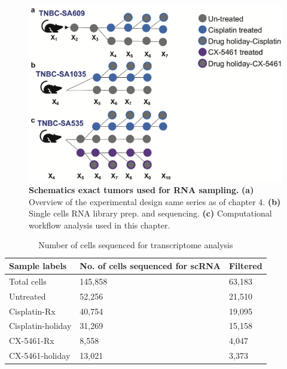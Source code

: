 \begin{figure}
\centering
\includegraphics[width=\textwidth]{Figures/chap5/SchematicsforRNAsampling.png}
	
\caption[SchematicsforRNAsampling]
	{\small
	\textbf{Schematics exact tumors used for RNA sampling.}
	   \textbf{(a)} Overview of the experimental design same series as of chapter 4.
	    \textbf{(b)} Single cells RNA library prep. and sequencing.
	    \textbf{(c)} Computational workflow analysis used in this chapter.
	}
	\label{fig:RNAsampletree}
\end{figure}


\begin{table}[htbp]
 \centering
  \caption{Number of cells sequenced for transcriptome analysis}
{
\begin{tabular}{|l|l|l|}
\hline
Sample labels     & No. of cells sequenced for scRNA & Filtered \\
\hline
Total cells          & 145,858                          & 63,183\\
Untreated         & 52,256                           & 21,510    \\
Cisplatin-Rx      & 40,754                           & 19,095    \\
Cisplatin-holiday & 31,269                           & 15,158    \\
CX-5461-Rx        & 8,558                            & 4,047     \\
CX-5461-holiday   & 13,021                           & 3,373  \\  
\hline
\end{tabular}%
\label{tab:nofcellsRNA}
}
\end{table}


